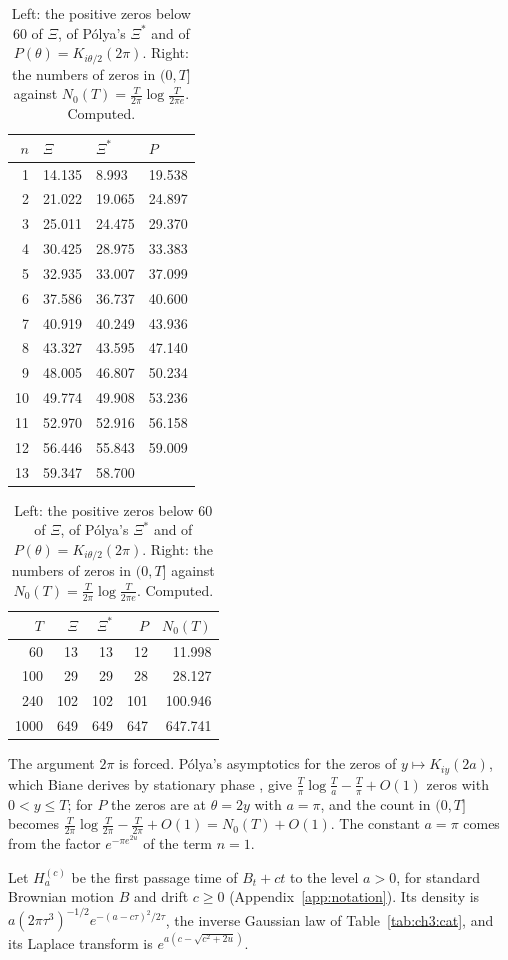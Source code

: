 \begin{table}[htbp]
\centering\small
\begin{tabular}{rlll}
\toprule
$n$ & $\Xi$ & $\Xi^*$ & $P$\\
\midrule
1 & 14.135 & 8.993 & 19.538\\
2 & 21.022 & 19.065 & 24.897\\
3 & 25.011 & 24.475 & 29.370\\
4 & 30.425 & 28.975 & 33.383\\
5 & 32.935 & 33.007 & 37.099\\
6 & 37.586 & 36.737 & 40.600\\
7 & 40.919 & 40.249 & 43.936\\
8 & 43.327 & 43.595 & 47.140\\
9 & 48.005 & 46.807 & 50.234\\
10 & 49.774 & 49.908 & 53.236\\
11 & 52.970 & 52.916 & 56.158\\
12 & 56.446 & 55.843 & 59.009\\
13 & 59.347 & 58.700 & \\
\bottomrule
\end{tabular}
\qquad
\begin{tabular}{rrrrr}
\toprule
$T$ & $\Xi$ & $\Xi^*$ & $P$ & $N_0(T)$\\
\midrule
60 & 13 & 13 & 12 & 11.998\\
100 & 29 & 29 & 28 & 28.127\\
240 & 102 & 102 & 101 & 100.946\\
1000 & 649 & 649 & 647 & 647.741\\
\bottomrule
\end{tabular}
\caption{Left: the positive zeros below $60$ of $\Xi$, of P\'olya's $\Xi^*$ and of $P(\theta)=K_{i\theta/2}(2\pi)$. Right: the numbers of zeros in $(0,T]$ against $N_0(T)=\frac T{2\pi}\log\frac T{2\pi e}$. Computed.}
\label{tab:biane:zeros}
\end{table}

The argument $2\pi$ is forced. P\'olya's asymptotics for the zeros of $y\mapsto K_{iy}(2a)$, which Biane derives by stationary phase \cite[Section 3.5]{Biane09}, give $\frac T\pi\log\frac Ta-\frac T\pi+O(1)$ zeros with $0<y\le T$; for $P$ the zeros are at $\theta=2y$ with $a=\pi$, and the count in $(0,T]$ becomes $\frac T{2\pi}\log\frac T{2\pi}-\frac T{2\pi}+O(1)=N_0(T)+O(1)$. The constant $a=\pi$ comes from the factor $e^{-\pi e^{2u}}$ of the term $n=1$.

Let $H^{(c)}_a$ be the first passage time of $B_t+ct$ to the level $a>0$, for standard Brownian motion $B$ and drift $c\ge0$ (Appendix~\ref{app:notation}). Its density is $a(2\pi\tau^3)^{-1/2}e^{-(a-c\tau)^2/2\tau}$, the inverse Gaussian law of Table~\ref{tab:ch3:cat}, and its Laplace transform is $e^{a(c-\sqrt{c^2+2u})}$.

